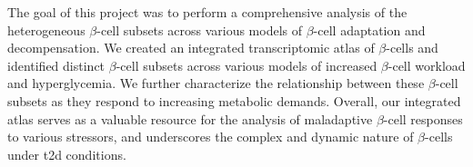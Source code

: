 \par The goal of this project was to perform a comprehensive analysis of the heterogeneous $\beta$-cell subsets across various models of $\beta$-cell adaptation and decompensation. We created an integrated transcriptomic atlas of $\beta$-cells and identified distinct $\beta$-cell subsets across various models of increased $\beta$-cell workload and hyperglycemia. We further characterize the relationship between these $\beta$-cell subsets as they respond to increasing metabolic demands. Overall, our integrated atlas serves as a valuable resource for the analysis of maladaptive $\beta$-cell responses to various  stressors, and underscores the complex and dynamic nature of $\beta$-cells under \gls{t2d} conditions.

